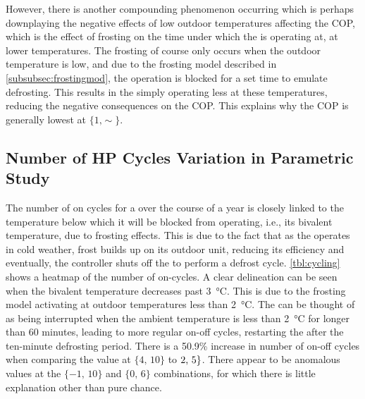 However, there is another compounding phenomenon occurring which is perhaps downplaying the negative effects of low outdoor temperatures affecting the \ac{COP}, which is the effect of frosting on the time under which the \HP is operating at, at lower temperatures. The frosting of course only occurs when the outdoor temperature is low, and due to the frosting model described in \cref{subsubsec:frostingmod}, the \HP operation is blocked for a set time to emulate defrosting. This results in the \HP simply operating less at these temperatures, reducing the negative consequences on the \ac{COP}. This explains why the \ac{COP} is generally lowest at $\{1\text{,}\sim\}$. 

\subsection{Number of \acs{HP} Cycles Variation in Parametric Study}

The number of on cycles for a \HP over the course of a year is closely linked to the temperature below which it will be blocked from operating, i.e., its bivalent temperature, due to frosting effects. This is due to the fact that as the \HP operates in cold weather, frost builds up on its outdoor unit, reducing its efficiency and eventually, the controller shuts off the \HP to perform a defrost cycle. \cref{tbl:cycling} shows a heatmap of the number of on-cycles. A clear delineation can be seen when the bivalent temperature decreases past \qty{3}{\celsius}. This is due to the frosting model activating at outdoor temperatures less than \qty{2}{\celsius}. The \HP can be thought of as being interrupted when the ambient temperature is less than \qty{2}{\celsius} for longer than 60 minutes, leading to more regular on-off cycles, restarting the \HP after the ten-minute defrosting period. There is a 50.9\% increase in number of on-off cycles when comparing the value at  $\{4\text{, }10\}$ to $\-2\text{, }5\}$. There appear to be anomalous values at the $\{-1\text{, }10\}$ and $\{0\text{, }6\}$ combinations, for which there is little explanation other than pure chance.

